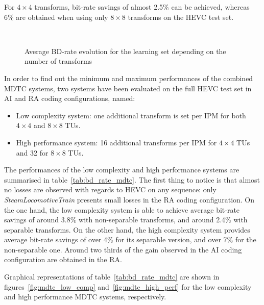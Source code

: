 \documentclass[11pt,a4paper,openright,twoside]{book}
\numberwithin{equation}{section} %
\numberwithin{figure}{section} %
\numberwithin{table}{section} %
\begin{document}
For $4\times4$ transforms, bit-rate savings of almost 2.5\% can be achieved,
whereas 6\% are obtained when using only $8\times8$ transforms on the
\ac{HEVC} test set.

\begin{figure}[tb]
	\centering
	\\
	\caption[\acs{BD}-rate for different separable and non-separable
	transform sets]
	{Average \acs{BD}-rate evolution for the learning set depending
	on the number of transforms}
	\label{fig:mdtc_bdrate_ntransforms}
\end{figure}

In order to find out the minimum and maximum performances of the combined
\ac{MDTC} systems, two systems have been evaluated on the full \ac{HEVC} test
set in \ac{AI} and \ac{RA} coding configurations, named:
\begin{itemize}
	\item Low complexity system: one additional transform is set per \ac{IPM}
		for both $4\times4$ and $8\times8$ \acp{TU}.
	\item High performance system: 16 additional transforms per \ac{IPM} for
		$4\times4$ \acp{TU} and 32 for $8\times8$ \acp{TU}.
\end{itemize}
The performances of the low complexity and high performance systems are
summarised in table~\ref{tab:bd_rate_mdtc}.
The first thing to notice is that almost no losses are observed with regards
to \ac{HEVC} on any sequence: only \emph{SteamLocomotiveTrain} presents small
losses in the \ac{RA} coding configuration.
On the one hand, the low complexity system is able to achieve average bit-rate
savings of around 3.8\% with non-separable transforms, and around 2.4\% with
separable transforms.
On the other hand, the high complexity system provides average bit-rate
savings of over 4\% for its separable version, and over 7\% for the
non-separable one.
Around two thirds of the gain observed in the \ac{AI} coding configuration are
obtained in the \ac{RA}.

Graphical representations of table~\ref{tab:bd_rate_mdtc} are shown in
figures~\ref{fig:mdtc_low_comp} and~\ref{fig:mdtc_high_perf} for the
low complexity and high performance \ac{MDTC} systems, respectively.
\end{document}
